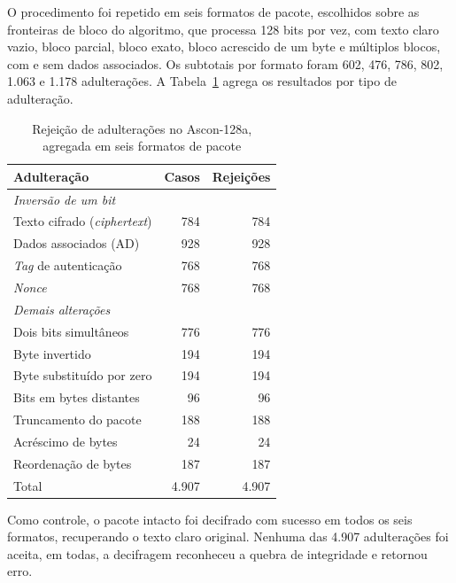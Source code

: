 O procedimento foi repetido em seis formatos de pacote, escolhidos sobre as fronteiras de bloco do algoritmo, que processa 128 bits por vez, com texto claro vazio, bloco parcial, bloco exato, bloco acrescido de um byte e múltiplos blocos, com e sem dados associados. Os subtotais por formato foram 602, 476, 786, 802, 1.063 e 1.178 adulterações. A Tabela~\ref{tab:aead_ascon128a} agrega os resultados por tipo de adulteração.

\begin{table}[htb]
\centering
\caption{Rejeição de adulterações no Ascon-128a, agregada em seis formatos de pacote}
\label{tab:aead_ascon128a}
\begin{tabular}{lrr}
\hline
\textbf{Adulteração} & \textbf{Casos} & \textbf{Rejeições} \\
\hline
\multicolumn{3}{l}{\textit{Inversão de um bit}} \\
\quad Texto cifrado (\textit{ciphertext}) & 784 & 784 \\
\quad Dados associados (AD)               & 928 & 928 \\
\quad \textit{Tag} de autenticação        & 768 & 768 \\
\quad \textit{Nonce}                      & 768 & 768 \\
\multicolumn{3}{l}{\textit{Demais alterações}} \\
\quad Dois bits simultâneos               & 776 & 776 \\
\quad Byte invertido                      & 194 & 194 \\
\quad Byte substituído por zero           & 194 & 194 \\
\quad Bits em bytes distantes             &  96 &  96 \\
\quad Truncamento do pacote               & 188 & 188 \\
\quad Acréscimo de bytes                  &  24 &  24 \\
\quad Reordenação de bytes                & 187 & 187 \\
\hline
Total                                     & 4.907 & 4.907 \\
\hline
\end{tabular}
\end{table}

Como controle, o pacote intacto foi decifrado com sucesso em todos os seis formatos, recuperando o texto claro original. Nenhuma das 4.907 adulterações foi aceita, em todas, a decifragem reconheceu a quebra de integridade e retornou erro.

